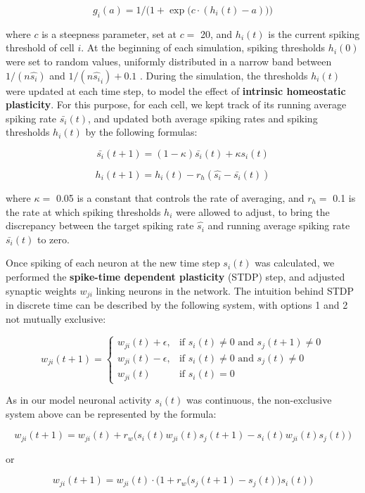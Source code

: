 \documentclass{article}
\begin{document}
\[ g_i(a) = 1/\Big(1+\exp\big(c\cdot(h_i(t)-a)\big)\Big) \]

where $c$ is a steepness parameter, set at $c=$ 20, and $h_i(t)$ is the current spiking threshold of cell $i$. At the beginning of each simulation, spiking thresholds $h_i(0)$ were set to random values, uniformly distributed in a narrow band between $1/(n \hat{s_i})$ and $1/(n \hat{s_i}_i)+0.1$ . During the simulation, the thresholds $h_i(t)$ were updated at each time step, to model the effect of \textbf{intrinsic homeostatic plasticity}. For this purpose, for each cell, we kept track of its running average spiking rate $\bar{s_i}(t)$, and updated both average spiking rates and spiking thresholds $h_i(t)$ by the following formulas:

\[ \bar{s_i}(t+1) = (1-\kappa)\bar{s_i}(t) + \kappa s_i(t) \]

\[ h_i(t+1) = h_i(t) - r_h(\hat{s_i} - \bar{s_i}(t)) \]

where $\kappa=$ 0.05 is a constant that controls the rate of averaging, and $r_h=$ 0.1 is the rate at which spiking thresholds $h_i$ were allowed to adjust, to bring the discrepancy between the target spiking rate $\hat{s_i}$ and running average spiking rate $\bar{s_i}(t)$ to zero.

Once spiking of each neuron at the new time step $s_i(t)$ was calculated, we performed the \textbf{spike-time dependent plasticity} (STDP) step, and adjusted synaptic weights $w_{ji}$ linking neurons in the network. The intuition behind STDP in discrete time can be described by the following system, with options 1 and 2 not mutually exclusive:

\[ w_{ji}(t+1) = \left \{ \begin{array}{lll} w_{ji}(t)+\epsilon, & \text{if } s_i(t)\neq 0 \text{ and } s_j(t+1)\neq 0 \\ w_{ji}(t)-\epsilon, & \text{if } s_i(t)\neq 0 \text{ and } s_j(t)\neq 0 \\ w_{ji}(t) & \text{if } s_i(t)=0\end{array} \right. \]

As in our model neuronal activity $s_i(t)$ was continuous, the non-exclusive system above can be represented by the formula:

\[ w_{ji}(t+1) = w_{ji}(t) + r_w \big(s_i(t)w_{ji}(t)s_j(t+1) - s_i(t)w_{ji}(t)s_j(t)\big) \]

or

\[ w_{ji}(t+1) = w_{ji}(t)\cdot\Big(1+r_w\big(s_j(t+1)-s_j(t)\big)s_i(t)\Big) \]
\end{document}
